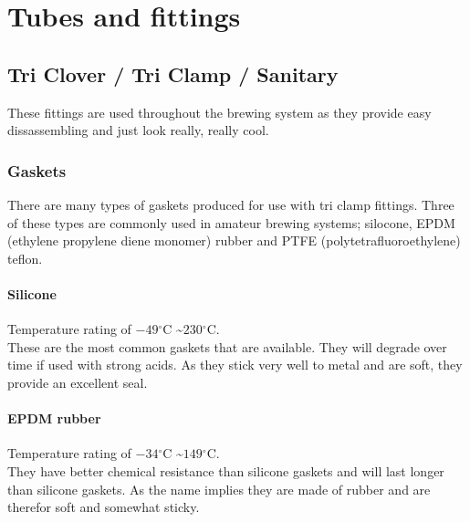 \documentclass[11pt,fleqn]{book} %
\newcommand{\degree}{\ensuremath{^\circ}}
\begin{document}
\pagestyle{fancy} %



\chapter{Tubes and fittings}

\section{Tri Clover / Tri Clamp / Sanitary}

These fittings are used throughout the brewing system as they provide easy dissassembling and just look really, really cool.

\subsection{Gaskets}

There are many types of gaskets produced for use with tri clamp fittings. Three of these types are commonly used in amateur brewing systems; silocone, EPDM (ethylene propylene diene monomer) rubber and PTFE (polytetrafluoroethylene) teflon.

\subsubsection{Silicone}

Temperature rating of $-49\degree$C \textasciitilde $230\degree$C.\\
These are the most common gaskets that are available. They will degrade over time if used with strong acids. As they stick very well to metal and are soft, they provide an excellent seal.

\subsubsection{EPDM rubber}

Temperature rating of $-34\degree$C \textasciitilde $149\degree$C.\\
They have better chemical resistance than silicone gaskets and will last longer than silicone gaskets. As the name implies they are made of rubber and are therefor soft and somewhat sticky.
\end{document}
